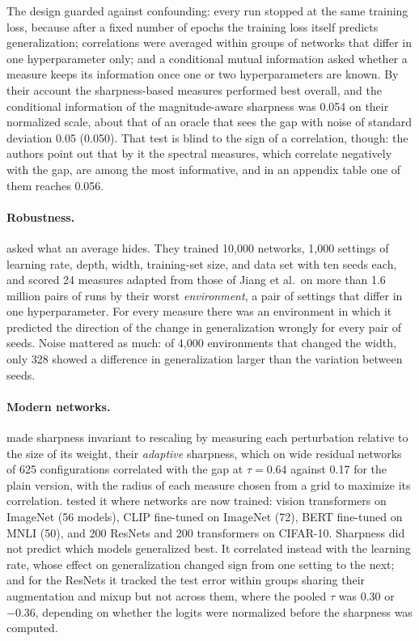 \begin{refsection}
The design guarded against confounding: every run stopped at the same training loss, because after a fixed number of epochs the training loss itself predicts generalization; correlations were averaged within groups of networks that differ in one hyperparameter only; and a conditional mutual information asked whether a measure keeps its information once one or two hyperparameters are known. By their account the sharpness-based measures performed best overall, and the conditional information of the magnitude-aware sharpness was 0.054 on their normalized scale, about that of an oracle that sees the gap with noise of standard deviation 0.05 (0.050). That test is blind to the sign of a correlation, though: the authors point out that by it the spectral measures, which correlate negatively with the gap, are among the most informative, and in an appendix table one of them reaches 0.056.

\paragraph{Robustness.} \Textcite{DziugaiteEtAl2020} asked what an average hides. They trained 10,000 networks, 1,000 settings of learning rate, depth, width, training-set size, and data set with ten seeds each, and scored 24 measures adapted from those of Jiang et al.\ on more than 1.6 million pairs of runs by their worst \emph{environment}, a pair of settings that differ in one hyperparameter. For every measure there was an environment in which it predicted the direction of the change in generalization wrongly for every pair of seeds. Noise mattered as much: of 4,000 environments that changed the width, only 328 showed a difference in generalization larger than the variation between seeds.

\paragraph{Modern networks.} \Textcite{KwonEtAl2021} made sharpness invariant to rescaling by measuring each perturbation relative to the size of its weight, their \emph{adaptive} sharpness, which on wide residual networks of 625 configurations correlated with the gap at $\tau=0.64$ against 0.17 for the plain version, with the radius of each measure chosen from a grid to maximize its correlation. \Textcite{AndriushchenkoEtAl2023} tested it where networks are now trained: vision transformers on ImageNet (56 models), CLIP fine-tuned on ImageNet (72), BERT fine-tuned on MNLI (50), and 200 ResNets and 200 transformers on CIFAR-10. Sharpness did not predict which models generalized best. It correlated instead with the learning rate, whose effect on generalization changed sign from one setting to the next; and for the ResNets it tracked the test error within groups sharing their augmentation and mixup but not across them, where the pooled $\tau$ was $0.30$ or $-0.36$, depending on whether the logits were normalized before the sharpness was computed.


\end{refsection}

